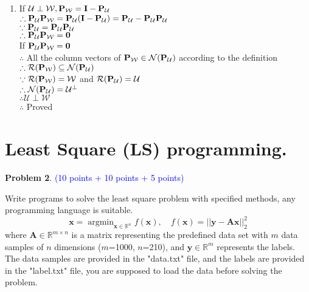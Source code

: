 \documentclass[english,onecolumn]{IEEEtran}
\newcommand{\Rbb}{\mathbb{R}}
\begin{document}
\begin{enumerate}
    \item
    If $\mathcal{U} \perp \mathcal{W}, \bf{P_{\mathcal{W}} = I - P_{\mathcal{U}}}$\\
    $\therefore \bf{P_{\mathcal{U}} P_{\mathcal{W}} = P_{\mathcal{U}} ( I - P_{\mathcal{U}}) = P_{\mathcal{U}} - P_{\mathcal{U}} P_{\mathcal{U}} }$\\
    $\because \bf{P_{\mathcal{U}} = P_{\mathcal{U}} P_{\mathcal{U}}} $\\
    $\therefore \bf{P_{\mathcal{U}} P_{\mathcal{W}}} = 0 $\\
    If $\bf{P_{\mathcal{U}} P_{\mathcal{W}}} = 0$\\
    $\therefore $ All the column vectors of $\bf{P_{\mathcal{W}} } \in \mathcal{N} (\bf{P_{\mathcal{U}
    }})$ according to the definition\\
    $\therefore \mathcal{R} (\bf{P_{\mathcal{W}}}) \subseteq \mathcal{N} (\bf{P_{\mathcal{U}}})$ \\
    $\because \mathcal{R}(\bf{P_{\mathcal{W}}}) = \mathcal{W}$ and $\mathcal{R}(\bf{P_{\mathcal{U}}}) = \mathcal{U}$\\
    $\therefore \mathcal{N}(\bf{P_{\mathcal{U}}}) = \mathcal{U}^{\perp}$\\
    $\therefore  \mathcal{U} \perp \mathcal{W} $\\
    $\therefore$ Proved
    
\end{enumerate}

\newpage
\section{Least Square (LS) programming.}
\noindent\textbf{Problem 2}. \textcolor{blue}{(10 points + 10 points + 5 points)}

Write programs to solve the least square problem with specified methods, any programming language is suitable.
$$
\mathbf{x} = \mathop{\arg\min}_{\mathbf{x} \in \Rbb^n} f(\mathbf{x}), \quad f(\mathbf{x}) = ||\mathbf{y}-\mathbf{A}\mathbf{x}||_2^2
$$
where $\mathbf{A} \in \Rbb^{m \times n}$ is a matrix representing the predefined data set with $m$ data samples of $n$ dimensions ($m$=1000, $n$=210), and $\mathbf{y} \in \Rbb^m$ represents the labels. The data samples are provided in the "data.txt" file, and the labels are provided in the "label.txt" file, you are supposed to load the data before solving the problem.
\end{document}
